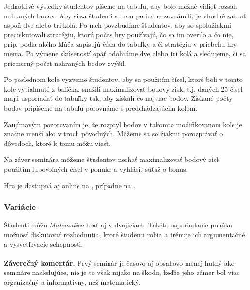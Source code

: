 {Jednotlivé výsledky študentov píšeme na tabuľu, aby bolo možné vidieť rozsah nahraných bodov. Aby si sa študenti s hrou poriadne zoznámili, je vhodné zahrať aspoň dve alebo tri kolá. Po nich povzbudíme študentov, aby so spolužiakmi prediskutovali stratégiu, ktorú počas hry používajú, čo sa im overilo a čo nie, príp. podľa akého kľúča zapisujú čísla do tabuľky a či stratégiu v priebehu hry menia. Po výmene skúseností opäť odohráme dve alebo tri kolá a sledujeme, či sa priemerný počet nahraných bodov zvýšil.

Po poslednom kole vyzveme študentov, aby sa použitím čísel, ktoré boli v tomto kole vytiahnuté z balíčka, snažili maximalizovať bodový zisk, t.j. daných 25 čísel majú usporiadať do tabuľky tak, aby získali čo najviac bodov. Získané počty bodov pripíšeme na tabuľu porovnáme s predchádzajúcim kolom.

Zaujímavým pozorovaním je, že rozptyl bodov v takomto modifikovanom kole je značne menší ako v troch pôvodných. Môžeme sa so žiakmi porozprávať o dôvodoch, ktoré k tomu môžu viesť.

Na záver seminára môžeme študentov nechať maximalizovať bodový zisk použitím ľubovoľných čísel v ponuke a vyhlásiť súťaž o bonus. 

Hra je dostupná aj online na \cite{mtico1}, prípadne na \cite{mtico2}.

\subsubsection*{Variácie}

Študenti môžu \textit{Matematico} hrať aj v dvojiciach. Takéto usporiadanie ponúka možnosť diskutovať rozhodnutia, ktoré študenti robia a trénuje ich argumentačné a vysvetľovacie schopnosti.\\
\\
\textbf{Záverečný komentár.}
Prvý seminár je časovo aj obsahovo menej hutný ako semináre nasledujúce, nie je to však nijako na škodu, keďže jeho zámer bol viac organizačný a informatívny, než matematický.
}
